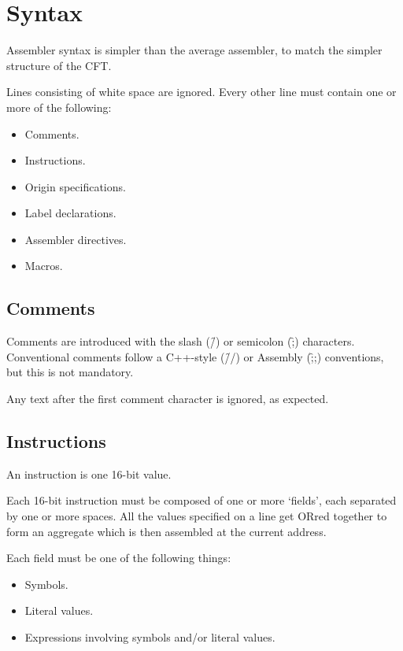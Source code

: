 \section{Syntax}

Assembler syntax is simpler than the average assembler, to match the
simpler structure of the CFT.

Lines consisting of white space are ignored. Every other line must
contain one or more of the following:

\begin{itemize}
\item Comments.
\item Instructions.
\item Origin specifications.
\item Label declarations.
\item Assembler directives.
\item Macros.
\end{itemize}

\subsection{Comments}

Comments are introduced with the slash (\f{/}) or semicolon (\f{;})
characters. Conventional comments follow a C++-style (\f{//}) or Assembly
(\f{;;}) conventions, but this is not mandatory.

Any text after the first comment character is ignored, as expected.

\subsection{Instructions}

An instruction is one 16-bit value.

Each 16-bit instruction must be composed of one or more ‘fields’, each
separated by one or more spaces. All the values specified on a line get ORred
together to form an aggregate which is then assembled at the current address.

Each field must be one of the following things:

\begin{itemize}
  \item Symbols.
  \item Literal values.
  \item Expressions involving symbols and/or literal values.
\end{itemize}

